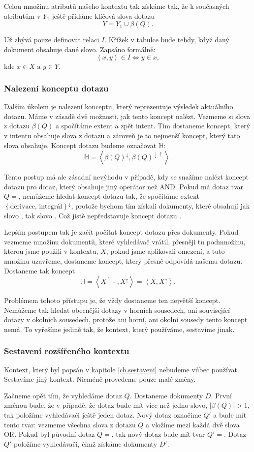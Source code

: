 \documentclass{article}
\newcommand{\sssection}[1]{\subsubsection{#1}}
\newcommand{\adds}[1]{\left\{#1\right\}}
\newcommand{\addsp}[1]{\left<#1\right>}
\newcommand{\up}{^{\uparrow}}
\newcommand{\down}{^{\downarrow}}
\newcommand{\updown}{^{\uparrow\downarrow}}
\newcommand{\downup}{^{\downarrow\uparrow}}
\newcommand{\hledany}{\mathbb{H}}
\begin{document}
Celou množinu atributů našeho kontextu tak získáme tak, že k současných atributům v $Y_1$ ještě přidáme klíčová slova dotazu
$$
Y=Y_1\cup\beta(Q).
$$

Už zbývá pouze definovat relaci $I$. Křížek v tabulce bude tehdy, když daný dokument obsahuje dané slovo. Zapsáno formálně:
$$
\addsp{x,y} \in I \iff y \in x,
$$
kde $x \in X$ a $y \in Y$.

\sssection{Nalezení konceptu dotazu}
Dalším úkolem je nalezení konceptu, který reprezentuje výsledek aktuálního dotazu. Máme v zásadě dvě možnosti, jak tento koncept nalézt. Vezmeme si slova z dotazu $\beta(Q)$ a spočítáme extent a zpět intent. Tím dostaneme koncept, který v intentu obsahuje slova z dotazu a zároveň je to nejmenší koncept, který tato slova obsahuje. Koncept dotazu budeme označovat $\hledany$:
$$
\hledany=\addsp{\beta(Q)\down, \beta(Q)\downup}.
$$

Tento postup má ale zásadní nevýhodu v případě, kdy se snažíme nalézt koncept dotazu pro dotaz, který obsahuje jiný operátor než AND. Pokud má dotaz tvar $Q=$, nemůžeme hledat koncept dotazu tak, že spočítáme extent $\adds{\mbox{derivace, integrál}}\down$, protože bychom tím získali dokumenty, které obsahují jak slovo , tak slovo . Což jistě nepředstavuje koncept dotazu .

Lepším postupem tak je začít počítat koncept dotazu přes dokumenty. Pokud vezmeme množinu dokumentů, které vyhledávač vrátil, přesněji tu podmnožinu, kterou jsme použili v kontextu, $X$, pokud jsme aplikovali omezení, a tuto množinu uzavřeme, dostaneme koncept, který přesně odpovídá našemu dotazu. Dostaneme tak koncept
$$
\hledany=\addsp{X\updown, X\up}=\addsp{X, X\up}.
$$

Problémem tohoto přístupu je, že vždy dostaneme ten největší koncept. Nemůžeme tak hledat obecnější dotazy v horních sousedech, ani související dotazy v okolních sousedech, protože ani horní, ani okolní sousedy tento koncept nemá. To vyřešíme jedině tak, že kontext, který používáme, sestavíme jinak. 


\sssection{Sestavení rozšířeného kontextu}
Kontext, který byl popsán v kapitole \ref{ch.sestaveni} nebudeme vůbec používat. Sestavíme jiný kontext. Nicméně provedeme pouze malé změny. 

Začneme opět tím, že vyhledáme dotaz $Q$. Dostaneme dokumenty $D$. První změnou bude, že v případě, že dotaz bude mít více než jedno slovo, $|\beta(Q)|>1$, tak položíme vyhledávači ještě jeden dotaz. Nový dotaz označíme $Q'$ a bude mít tento tvar: vezmeme všechna slova z dotazu $Q$ a vložíme mezi každá dvě slova OR. Pokud byl původní dotaz $Q=$, tak nový dotaz bude mít tvar $Q'=$. Dotaz $Q'$ položíme vyhledávači, čímž získáme dokumenty $D'$.
\end{document}
